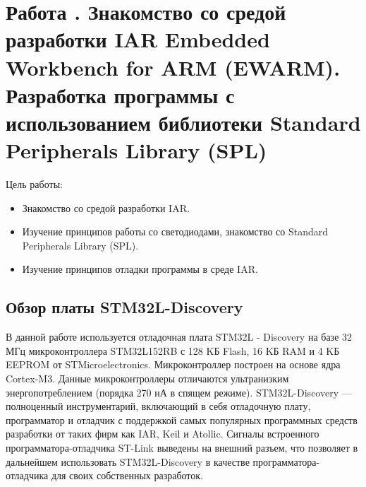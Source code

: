 \chapter{Работа . Знакомство со средой разработки IAR Embedded Workbench for ARM (EWARM). Разработка программы с использованием библиотеки Standard Peripherals Library (SPL)}
Цель работы: 
\begin{itemize}
\item Знакомство со средой разработки IAR.
\item Изучение принципов работы со светодиодами, знакомство со Standard Peripherals Library (SPL).
\item Изучение принципов отладки программы в среде IAR.
\end{itemize}
\section{Обзор платы STM32L-Discovery}
В данной работе используется отладочная плата STM32L - Discovery на базе 32 МГц микроконтроллера STM32L152RB с 128 KБ Flash, 16 KБ RAM и 4 KБ EEPROM от STMicroelectronics.  Микроконтроллер построен на основе ядра Cortex-M3. Данные микроконтроллеры отличаются ультранизким энергопотреблением (порядка 270 нА в спящем режиме). STM32L-Discovery --- полноценный инструментарий, включающий в себя отладочную плату, программатор и отладчик с поддержкой самых популярных программных средств разработки от таких фирм как IAR, Keil и Atollic. Сигналы встроенного программатора-отладчика ST-Link выведены на внешний разъем, что позволяет в дальнейшем использовать STM32L-Discovery в качестве программатора-отладчика для своих собственных разработок.

